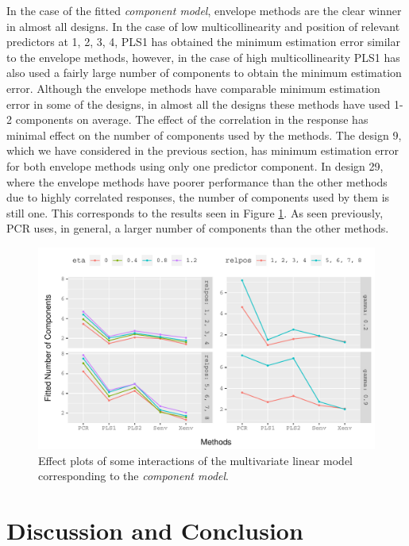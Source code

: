 \documentclass[12pt,3p,authoryear]{elsarticle}
\begin{document}
In the case of the fitted \emph{component model}, envelope methods are
the clear winner in almost all designs. In the case of low
multicollinearity and position of relevant predictors at 1, 2, 3, 4,
PLS1 has obtained the minimum estimation error similar to the envelope
methods, however, in the case of high multicollinearity PLS1 has also
used a fairly large number of components to obtain the minimum
estimation error. Although the envelope methods have comparable minimum
estimation error in some of the designs, in almost all the designs these
methods have used 1-2 components on average. The effect of the
correlation in the response has minimal effect on the number of
components used by the methods. The design 9, which we have considered
in the previous section, has minimum estimation error for both envelope
methods using only one predictor component. In design 29, where the
envelope methods have poorer performance than the other methods due to
highly correlated responses, the number of components used by them is
still one. This corresponds to the results seen in Figure
\ref{fig:comp-eff-plots}. As seen previously, PCR uses, in general, a
larger number of components than the other methods.




\begin{figure}[!htb]
\includegraphics[width=1\linewidth]{Images/pdf/comp-eff-plots-1} \caption{Effect plots of some interactions of the
multivariate linear model corresponding to the \emph{component model}.}\label{fig:comp-eff-plots}
\end{figure}

\section{Discussion and Conclusion}\label{discussion-and-conclusion}
\end{document}
